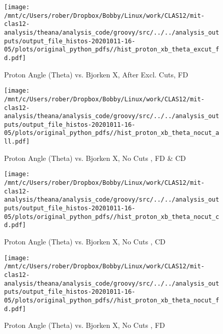 \documentclass{article}
\begin{document}
\begin{landscape}
    \begin{figure}[h]
        \centering

        \texttt{[image: /mnt/c/Users/rober/Dropbox/Bobby/Linux/work/CLAS12/mit-clas12-analysis/theana/analysis\_code/groovy/src/../../analysis\_outputs/output\_file\_histos-20201011-16-05/plots/original\_python\_pdfs//hist\_proton\_xb\_theta\_excut\_fd.pdf]}
        \captionsetup{textformat=empty,labelformat=blank}
        \caption{Proton Angle (Theta) vs. Bjorken X, After Excl. Cuts, FD}
    \end{figure}
    \clearpage
    
    \begin{figure}[h]
        \centering

        \texttt{[image: /mnt/c/Users/rober/Dropbox/Bobby/Linux/work/CLAS12/mit-clas12-analysis/theana/analysis\_code/groovy/src/../../analysis\_outputs/output\_file\_histos-20201011-16-05/plots/original\_python\_pdfs//hist\_proton\_xb\_theta\_nocut\_all.pdf]}
        \captionsetup{textformat=empty,labelformat=blank}
        \caption{Proton Angle (Theta) vs. Bjorken X, No Cuts , FD \& CD}
    \end{figure}
    \clearpage
    
    \begin{figure}[h]
        \centering

        \texttt{[image: /mnt/c/Users/rober/Dropbox/Bobby/Linux/work/CLAS12/mit-clas12-analysis/theana/analysis\_code/groovy/src/../../analysis\_outputs/output\_file\_histos-20201011-16-05/plots/original\_python\_pdfs//hist\_proton\_xb\_theta\_nocut\_cd.pdf]}
        \captionsetup{textformat=empty,labelformat=blank}
        \caption{Proton Angle (Theta) vs. Bjorken X, No Cuts , CD}
    \end{figure}
    \clearpage
    
    \begin{figure}[h]
        \centering

        \texttt{[image: /mnt/c/Users/rober/Dropbox/Bobby/Linux/work/CLAS12/mit-clas12-analysis/theana/analysis\_code/groovy/src/../../analysis\_outputs/output\_file\_histos-20201011-16-05/plots/original\_python\_pdfs//hist\_proton\_xb\_theta\_nocut\_fd.pdf]}
        \captionsetup{textformat=empty,labelformat=blank}
        \caption{Proton Angle (Theta) vs. Bjorken X, No Cuts , FD}
    \end{figure}
    \clearpage
    
    \begin{figure}[h]
        \centering


\end{figure}
\end{landscape}
\end{document}
